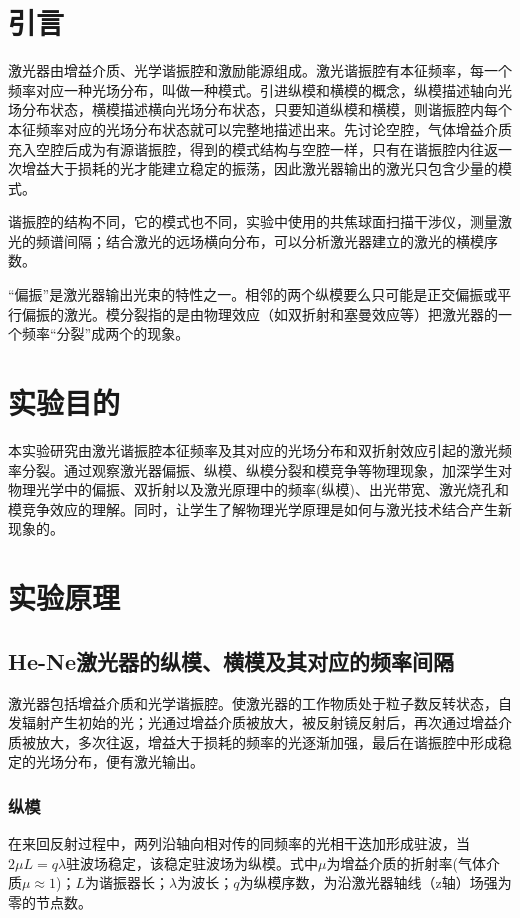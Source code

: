 \documentclass[UTF8]{ctexart}
\begin{document}
\begin{multicols}{2}

\section{引言}
激光器由增益介质、光学谐振腔和激励能源组成。激光谐振腔有本征频率，每一个频率对应一种光场分布，叫做一种模式。引进纵模和横模的概念，纵模描述轴向光场分布状态，横模描述横向光场分布状态，只要知道纵模和横模，则谐振腔内每个本征频率对应的光场分布状态就可以完整地描述出来。先讨论空腔，气体增益介质充入空腔后成为有源谐振腔，得到的模式结构与空腔一样，只有在谐振腔内往返一次增益大于损耗的光才能建立稳定的振荡，因此激光器输出的激光只包含少量的模式。

谐振腔的结构不同，它的模式也不同，实验中使用的共焦球面扫描干涉仪，测量激光的频谱间隔；结合激光的远场横向分布，可以分析激光器建立的激光的横模序数。

“偏振”是激光器输出光束的特性之一。相邻的两个纵模要么只可能是正交偏振或平行偏振的激光。模分裂指的是由物理效应（如双折射和塞曼效应等）把激光器的一个频率“分裂”成两个的现象。


\section{实验目的}
本实验研究由激光谐振腔本征频率及其对应的光场分布和双折射效应引起的激光频率分裂。通过观察激光器偏振、纵模、纵模分裂和模竞争等物理现象，加深学生对物理光学中的偏振、双折射以及激光原理中的频率(纵模)、出光带宽、激光烧孔和模竞争效应的理解。同时，让学生了解物理光学原理是如何与激光技术结合产生新现象的。

\section{实验原理}
\subsection{He-Ne激光器的纵模、横模及其对应的频率间隔}
激光器包括增益介质和光学谐振腔。使激光器的工作物质处于粒子数反转状态，自发辐射产生初始的光；光通过增益介质被放大，被反射镜反射后，再次通过增益介质被放大，多次往返，增益大于损耗的频率的光逐渐加强，最后在谐振腔中形成稳定的光场分布，便有激光输出。

\subsubsection{纵模}
在来回反射过程中，两列沿轴向相对传的同频率的光相干迭加形成驻波，当$2\mu L=q\lambda$驻波场稳定，该稳定驻波场为纵模。式中$\mu$为增益介质的折射率(气体介质$\mu\approx1$)；$L$为谐振器长；$\lambda$为波长；$q$为纵模序数，为沿激光器轴线（z轴）场强为零的节点数。


\end{multicols}
\end{document}
